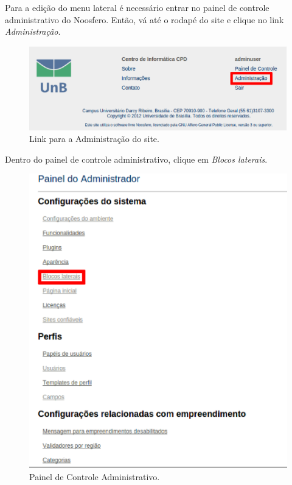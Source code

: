 Para a edição do menu lateral é necessário entrar no painel de controle administrativo do Noosfero. Então, vá até o rodapé do site e clique no link \emph{Administração}.

\begin{figure}[h]
     \centering
       \includegraphics[keepaspectratio=true,scale=0.5]{figuras/linkAdmin.eps}
     \caption{Link para a Administração do site.}
     \label{fig:linkAdmin}
\end{figure}

Dentro do painel de controle administrativo, clique em \emph{Blocos laterais}.

\begin{figure}[h]
     \centering
       \includegraphics[keepaspectratio=true,scale=0.5]{figuras/administracao.eps}
     \caption{Painel de Controle Administrativo.}
     \label{fig:painelAdministrativo}
\end{figure}

